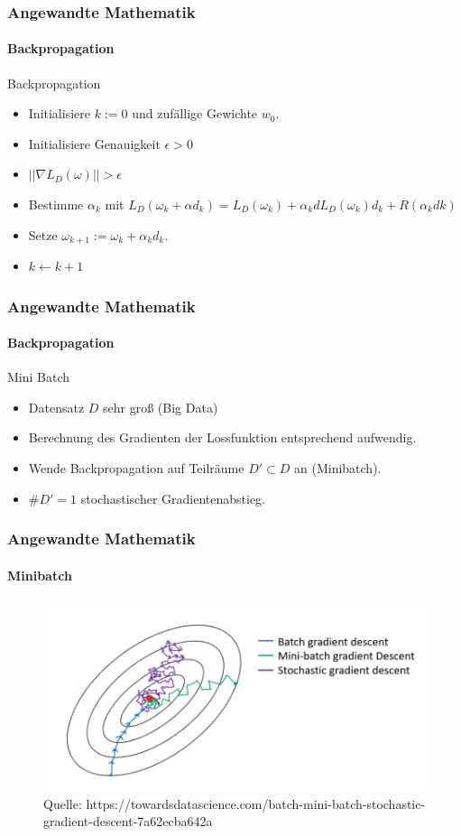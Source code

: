 \documentclass{beamer}
\begin{document}
\begin{frame}
    \frametitle{Angewandte Mathematik}
\framesubtitle{Backpropagation}
    \begin{block}{Backpropagation}
\begin{itemize}
\item  Initialisiere $k:=0$ und zufällige Gewichte $w_0$.
\item \pause Initialisiere Genauigkeit $\epsilon > 0$
\item \pause   {} {$|| \nabla L_D(\omega) || > \epsilon$}  
\item \pause Bestimme $\alpha_k$  mit $ L_D(\omega_k + \alpha d_k) =  L_D(\omega_k) + \alpha_k d L_D(\omega_k)d_k + R( \alpha_k dk)$ 
\item \pause  Setze $\omega_{k+1} := \omega_k  + \alpha_k d_k$. 
\item \pause $k \leftarrow k+1$
\end{itemize}
\end{block}
 \end{frame}

\begin{frame}
    \frametitle{Angewandte Mathematik}
\framesubtitle{Backpropagation}
    \begin{block}{Mini Batch}
\begin{itemize}
\item   Datensatz $D$ sehr groß (Big Data)
\item \pause Berechnung des Gradienten der Lossfunktion entsprechend aufwendig. 
\item \pause Wende Backpropagation auf Teilräume $D' \subset D$ an (Minibatch).
\item \pause $\#D' = 1$ stochastischer Gradientenabstieg.
\end{itemize}

\end{block}
 \end{frame}



\begin{frame}
    \frametitle{Angewandte Mathematik}
\framesubtitle{Minibatch}
\begin{figure}[H]
      \centering
    \includegraphics[width=1.0\textwidth]{images/batchgradient}
      \caption{Quelle: https://towardsdatascience.com/batch-mini-batch-stochastic-gradient-descent-7a62ecba642a}
\end{figure}

 \end{frame}
\end{document}
